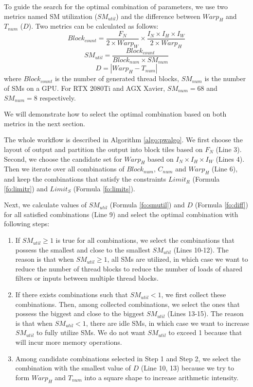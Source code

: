 To guide the search for the optimal combination of parameters, we use two metrics named SM utilization ($SM_{util}$) and the difference between $Warp_H$ and $T_{num}$ ($D$).
Two metrics can be calculated as follows:
\begin{equation}\nonumber
    Block_{count}=\frac{F_N}{2 \times Warp_W} \times \frac{I_N \times I_H \times I_W}{2 \times Warp_H}
\end{equation}
\begin{equation}
    SM_{util}=\frac{Block_{count}}{Block_{num}\times SM_{num}}
    \label{fo:smutil}
\end{equation}
\begin{equation}
    D = |Warp_H-T_{num}|
    \label{fo:diff}
\end{equation}
where $Block_{count}$ is the number of generated thread blocks, $SM_{num}$ is the number of SMs on a GPU. For RTX 2080Ti and AGX Xavier, $SM_{num}=68$ and $SM_{num}=8$ respectively.

We will demonstrate how to select the optimal combination based on both metrics in the next section.


The whole workflow is described in Algorithm \ref{algo:pwalgo}.
We first choose the layout of output and partition the output into block tiles based on $F_N$ (Line 3).
Second, we choose the candidate set for $Warp_H$ based on $I_N \times I_H \times I_W$ (Lines 4).
Then we iterate over all combinations of $Block_{num}$, $C_{num}$ and $Warp_H$ (Line 6), and keep the combinations that satisfy the constraints $Limit_R$ (Formula \ref{fo:limitr}) and $Limit_S$ (Formula \ref{fo:limits}).

Next, we calculate values of $SM_{util}$ (Formula \ref{fo:smutil}) and $D$ (Formula \ref{fo:diff}) for all satisfied combinations (Line 9) and select the optimal combination with following steps:
\begin{enumerate}[Step 1]
    \item If $SM_{util} \geq 1$ is true for all combinations, we select the combinations that possess the smallest and close to the smallest $SM_{util}$ (Lines 10-12).
    The reason is that when $SM_{util} \geq 1$, all SMs are utilized, in which case we want to reduce the number of thread blocks to reduce the number of loads of shared filters or inputs between multiple thread blocks.
    \item If there exists combinations such that $SM_{util}<1$, we first collect these combinations. Then, among collected combinations, we select the ones that possess the biggest and close to the biggest $SM_{util}$ (Lines 13-15).
    The reason is that when $SM_{util}<1$, there are idle SMs, in which case we want to increase $SM_{util}$ to fully utilize SMs. We do not want $SM_{util}$ to exceed 1 because that will incur more memory operations.
    \item Among candidate combinations selected in Step 1 and Step 2, we select the combination with the smallest value of $D$ (Line 10, 13) because we try to form $Warp_H$ and $T_{num}$ into a square shape to increase arithmetic intensity.
\end{enumerate}

